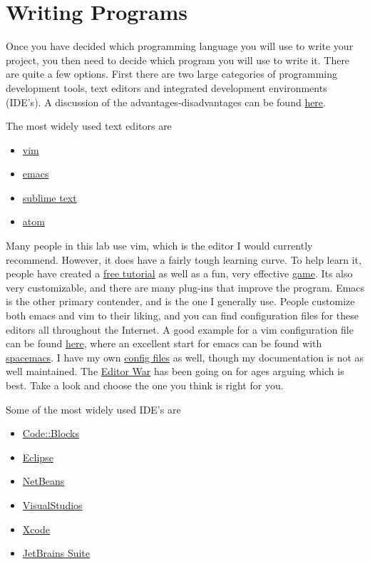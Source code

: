 \documentclass{article}
\begin{document}
\section*{Writing Programs}

Once you have decided which programming language you will use to write your project, you then need to decide which program you will use to write it.
There are quite a few options.
First there are two large categories of programming development tools, text editors and integrated development environments (IDE's).
A discussion of the advantages-disadvantages can be found \href{http://stackoverflow.com/questions/208193/why-should-i-use-an-ide}{here}.

The most widely used text editors are

\begin{itemize}
  \item{\href{https://www.youtube.com/watch?v=_NUO4JEtkDw}{vim}}
  \item{\href{https://www.youtube.com/watch?v=B6jfrrwR10k}{emacs}}
  \item{\href{https://www.sublimetext.com/}{sublime text}}
  \item{\href{https://atom.io/}{atom}}
\end{itemize}

Many people in this lab use vim, which is the editor I would currently recommend. 
However, it does have a fairly tough learning curve.
To help learn it, people have created a \href{http://www.openvim.com/}{free tutorial} as well as a fun, very effective \href{http://vim-adventures.com/}{game}.
Its also very customizable, and there are many plug-ins that improve the program.
Emacs is the other primary contender, and is the one I generally use.
People customize both emacs and vim to their liking, and you can find configuration files for these editors all throughout the Internet.
A good example for a vim configuration file can be found \href{https://github.com/amix/vimrc}{here}, where an excellent start for emacs can be found with \href{http://spacemacs.org/}{spacemacs}. 
I have my own \href{https://github.com/PotentialParadox/User_Configurations}{config files} as well, though my documentation is not as well maintained.
The \href{https://en.wikipedia.org/wiki/Editor_war}{Editor War} has been going on for ages arguing which is best.
Take a look and choose the one you think is right for you.

Some of the most widely used IDE's are

\begin{itemize}
  \item{\href{http://www.codeblocks.org/}{Code::Blocks}}
  \item{\href{https://eclipse.org/downloads/}{Eclipse}}
  \item{\href{https://netbeans.org/}{NetBeans}}
  \item{\href{https://www.visualstudio.com/en-us/visual-studio-homepage-vs.aspx}{VisualStudios}}
  \item{\href{https://developer.apple.com/xcode/}{Xcode}}
  \item{\href{https://www.jetbrains.com/}{JetBrains Suite}}
\end{itemize}
\end{document}
